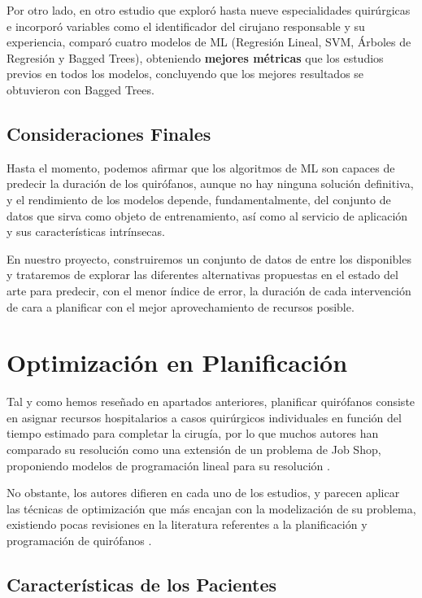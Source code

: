 Por otro lado, en otro estudio que exploró hasta nueve especialidades quirúrgicas \cite{Martinez2021MachinePrediction} e incorporó variables como el identificador del cirujano responsable y su experiencia, comparó cuatro modelos de ML (Regresión Lineal, SVM, Árboles de Regresión y Bagged Trees), obteniendo \textbf{mejores métricas} que los estudios previos en todos los modelos, concluyendo que los mejores resultados se obtuvieron con Bagged Trees.

\subsection{Consideraciones Finales}

Hasta el momento, podemos afirmar que los algoritmos de ML son capaces de predecir la duración de los quirófanos, aunque no hay ninguna solución definitiva, y el rendimiento de los modelos depende, fundamentalmente, del conjunto de datos que sirva como objeto de entrenamiento, así como al servicio de aplicación y sus características intrínsecas.

En nuestro proyecto, construiremos un conjunto de datos de entre los disponibles y trataremos de explorar las diferentes alternativas propuestas en el estado del arte para predecir, con el menor índice de error, la duración de cada intervención de cara a planificar con el mejor aprovechamiento de recursos posible.

\newpage
\section{Optimización en Planificación}

Tal y como hemos reseñado en apartados anteriores, planificar quirófanos consiste en asignar recursos hospitalarios a casos quirúrgicos individuales en función del tiempo estimado para completar la cirugía, por lo que muchos autores han comparado su resolución como una extensión de un problema de Job Shop, proponiendo modelos de programación lineal para su resolución \cite{Pham2008SurgicalProblem} .

No obstante, los autores difieren en cada uno de los estudios, y parecen aplicar las técnicas de optimización que más encajan con la modelización de su problema, existiendo pocas revisiones en la literatura referentes a la planificación y programación de quirófanos \cite{Gur2018ApplicationOverview}. 

\subsection{Características de los Pacientes}

